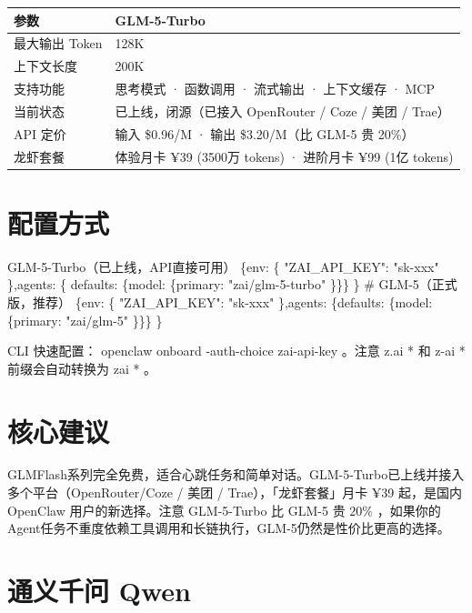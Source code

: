 \documentclass[
  10
]{article}
\newenvironment{Shaded}{}{}
\newcommand{\NormalTok}[1]{#1}
\newcounter{none} %
\begin{document}
{\def\LTcaptype{none} %
\begin{longtable}[]{@{}|l|l|@{}}
\toprule\noalign{}
\endhead
\bottomrule\noalign{}
\endlastfoot
\hline
参数 & GLM-5-Turbo \\
\hline
最大输出 Token & 128K \\
\hline
上下文长度 & 200K \\
\hline
支持功能 & 思考模式 · 函数调用 · 流式输出 · 上下文缓存 · MCP \\
\hline
当前状态 & 已上线，闭源（已接入 OpenRouter / Coze / 美团 / Trae） \\
\hline
API 定价 & 输入 \$0.96/M · 输出 \$3.20/M（比 GLM-5 贵 20\%） \\
\hline
龙虾套餐 & 体验月卡 ¥39 (3500万 tokens) · 进阶月卡 ¥99 (1亿 tokens) \\
\hline
\end{longtable}
}

\section{配置方式}\label{ux914dux7f6eux65b9ux5f0f-3}

\begin{Shaded}
\begin{Highlighting}[]
\NormalTok{GLM{-}5{-}Turbo（已上线，API直接可用）  }
\NormalTok{\{env: \{ "ZAI\_API\_KEY": "sk{-}xxx" \},agents: \{ defaults: \{model: \{primary: "zai/glm{-}5{-}turbo" \}\}\}  }
\NormalTok{\}  }
\NormalTok{\# GLM{-}5（正式版，推荐）  }
\NormalTok{\{env: \{ "ZAI\_API\_KEY": "sk{-}xxx" \},agents: \{defaults: \{model: \{primary: "zai/glm{-}5" \}\}\}  }
\NormalTok{\}}
\end{Highlighting}
\end{Shaded}

CLI 快速配置： openclaw onboard -auth-choice zai-api-key 。注意 z.ai *
和 z-ai * 前缀会自动转换为 zai * 。

\section{核心建议}\label{ux6838ux5fc3ux5efaux8bae-18}

GLMFlash系列完全免费，适合心跳任务和简单对话。GLM-5-Turbo已上线并接入多个平台（OpenRouter/Coze
/ 美团 / Trae），「龙虾套餐」月卡 ¥39 起，是国内 OpenClaw
用户的新选择。注意 GLM-5-Turbo 比 GLM-5 贵 \(2 0 \%\)
，如果你的Agent任务不重度依赖工具调用和长链执行，GLM-5仍然是性价比更高的选择。

\section{通义千问 Qwen}\label{ux901aux4e49ux5343ux95ee-qwen}
\end{document}
